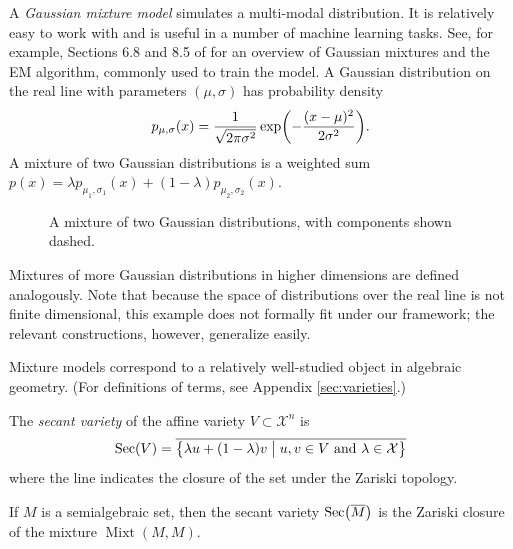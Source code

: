 \documentclass[cclicense]{hmcthesis}
\newcommand*{\F}{\mathcal{X}}
\newcommand*{\vbar}{\;\big\vert\;}
\DeclareMathOperator{\Mixt}{Mixt}
\DeclareMathOperator{\Sec}{Sec}
\numberwithin{equation}{section}
\begin{document}
    \begin{example}
    A \emph{Gaussian mixture model} simulates a multi-modal distribution.  It is
    relatively easy to work with and is useful in a number of machine learning
    tasks.  See, for example, Sections 6.8 and 8.5 of \citep{EOSL} for an
    overview of Gaussian mixtures and the EM algorithm, commonly used to train
    the model.  A Gaussian distribution on the real line with parameters $(\mu,
    \sigma)$ has probability density
    \[
        p_{\mu, \sigma}(x) = \frac{1}{\sqrt{2\pi\sigma^2}} 
        \exp\pdel*{-\frac{(x - \mu)^2}{2\sigma^2}}.
    \]
    A mixture of two Gaussian distributions is a weighted sum $p(x) = \lambda
    p_{\mu_1, \sigma_1}(x) + (1 - \lambda)p_{\mu_2, \sigma_2}(x)$.  
    \begin{figure}[H]
        \centering
        \caption{A mixture of two Gaussian distributions, with components shown
        dashed.}
    \end{figure}
    Mixtures of more Gaussian distributions in higher dimensions are defined
    analogously.  Note that because the space of distributions over the real
    line is not finite dimensional, this example does not formally fit under our
    framework; the relevant constructions, however, generalize easily.
    \end{example}

    Mixture models correspond to a relatively well-studied object in algebraic
    geometry.  (For definitions of terms, see Appendix \ref{sec:varieties}.)
    \begin{definition}
    The \emph{secant variety} of the affine variety $V \subset \F^n$ is
    \[
        \Sec(V) = \overline{\cdel[\big]{
        \lambda u + (1 - \lambda) v \vbar
        u,v \in V
        \text{ and }
        \lambda \in \F
        }}
    \]
    where the line indicates the closure of the set under the Zariski topology.  
    \end{definition}
    \begin{proposition}
    If $M$ is a semialgebraic set, then the secant variety
    $\Sec\pdel[\big]{\overline{M}}$ is the Zariski closure of the mixture
    $\Mixt(M, M)$.
    \end{proposition}
\end{document}
